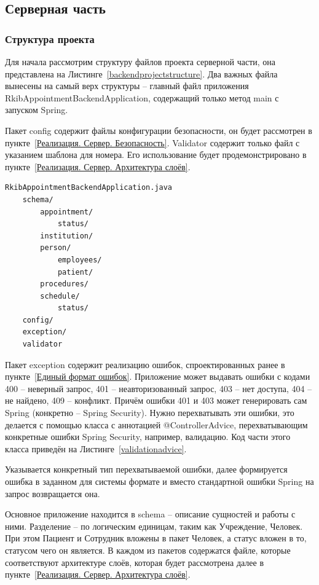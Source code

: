 \documentclass[a4paper,article]{article}
\begin{document}
\begin{sloppypar}
    \subsection{Серверная часть}\label{Реализация. Серверная часть}

    \subsubsection{Структура проекта}

    Для начала рассмотрим структуру файлов проекта серверной части, она представлена на Листинге~\ref{backendprojectstructure}. Два важных файла вынесены на самый верх структуры -- главный файл приложения RkibAppointmentBackendApplication, содержащий только метод main с запуском Spring.

    Пакет config содержит файлы конфигурации безопасности, он будет рассмотрен в пункте~\ref{Реализация. Сервер. Безопасность}. Validator содержит только файл с указанием шаблона для номера. Его использование будет продемонстрировано в пункте~\ref{Реализация. Сервер. Архитектура слоёв}.
    
    \newpage

    \begin{lstlisting}[label=backendprojectstructure,caption=Структура серверного приложения]
    RkibAppointmentBackendApplication.java
    schema/
        appointment/
            status/
        institution/
        person/
            employees/
            patient/
        procedures/
        schedule/
            status/
    config/
    exception/
    validator
    \end{lstlisting}

    Пакет exception содержит реализацию ошибок, спроектированных ранее в пункте~\ref{Единый формат ошибок}. Приложение может выдавать ошибки с кодами 400 -- неверный запрос, 401 -- неавторизованный запрос, 403 -- нет доступа, 404 -- не найдено, 409 -- конфликт. Причём ошибки 401 и 403 может генерировать сам Spring (конкретно -- Spring Security). Нужно перехватывать эти ошибки, это делается с помощью класса с аннотацией @ControllerAdvice, перехватывающим конкретные ошибки Spring Security, например, валидацию. Код части этого класса приведён на Листинге~\ref{validationadvice}.
    
    Указывается конкретный тип перехватываемой ошибки, далее формируется ошибка в заданном для системы формате и вместо стандартной ошибки Spring на запрос возвращается она.
    
    Основное приложение находится в schema -- описание сущностей и работы с ними. Разделение -- по логическим единицам, таким как Учреждение, Человек. При этом Пациент и Сотрудник вложены в пакет Человек, а статус вложен в то, статусом чего он является. В каждом из пакетов содержатся файле, которые соответствуют архитектуре слоёв, которая будет рассмотрена далее в пункте~\ref{Реализация. Сервер. Архитектура слоёв}.
    

\end{sloppypar}
\end{document}
